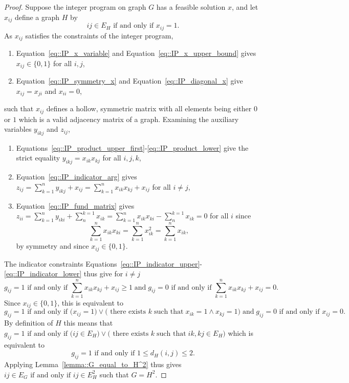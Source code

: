 \documentclass[11pt]{article}
\begin{document}
\begin{proof}
  Suppose the integer program on graph $G$ has a feasible solution $x$, and let $x_{ij}$ define a graph $H$ by 
  \[
  ij \in E_H \text{ if and only if } x_{ij} = 1. 
  \]
  As $x_{ij}$ satisfies the constraints of the integer program, 
  \begin{enumerate}[label=\roman*)]
    \item Equation~\eqref{eq::IP_x_variable} and Equation~\eqref{eq::IP_x_upper_bound} gives $x_{ij} \in \{0 , 1\}$ for all $i,j$,
    \item Equation~\eqref{eq::IP_symmetry_x} and Equation~\eqref{eq::IP_diagonal_x} give $x_{ij} = x_{ji}$ and $x_{ii} = 0$,
  \end{enumerate}
  such that $x_{ij}$ defines a hollow, symmetric matrix with all elements being either $0$ or $1$ which is a valid adjacency matrix of a graph. 
  Examining the auxiliary variables $y_{ikj}$ and $z_{ij}$, 
  \begin{enumerate}[label=\roman*)]
    \item Equations~\eqref{eq::IP_product_upper_first}-\eqref{eq::IP_product_lower} give the strict equality $y_{ikj} = x_{ik}x_{kj}$ for all $i,j,k$,
    \item Equation~\eqref{eq::IP_indicator_arg} gives $\displaystyle z_{ij} = \sum_{k = 1}^{n}y_{ikj} + x_{ij} = \sum_{k = 1}^{n}x_{ik}x_{kj} + x_{ij}$ for all $i \neq j$,
    \item Equation~\eqref{eq::IP_fund_matrix} gives $\displaystyle z_{ii} = \sum_{k = 1}^{n}y_{iki} + \sum_{n}^{k = 1}x_{ik} = \sum_{k = 1}^{n} x_{ik}x_{ki} - \sum_{n}^{k = 1}x_{ik} = 0$ for all $i$ since
    \[
    \sum_{k = 1}^{n} x_{ik}x_{ki} = \sum_{k = 1}^{n} x_{ik}^2 = \sum_{k = 1}^{n} x_{ik},
    \]
    by symmetry and since $x_{ij} \in \{0 , 1\}$. 
  \end{enumerate} 
  The indicator constraints Equations~\eqref{eq::IP_indicator_upper}-\eqref{eq::IP_indicator_lower} thus give for $i \neq j$
  \[
  g_{ij} = 1 \text{ if and only if } \sum_{k=1}^{n} x_{ik}x_{kj} + x_{ij} \geq 1 \; \text{and} \; g_{ij} = 0 \text{ if and only if } \sum_{k=1}^{n} x_{ik}x_{kj} + x_{ij} = 0. 
  \]
  Since $x_{ij} \in \{0,1\}$, this is equivalent to 
  \[
  g_{ij} = 1 \text{ if and only if } \Big(x_{ij} = 1 \Big) \lor \Big(\text{ there exists } k \;\text{such that}\; x_{ik}= 1 \land x_{kj}=1\Big) \; \text{and} \; g_{ij} = 0 \text{ if and only if } x_{ij} = 0. 
  \]
  By definition of $H$ this means that $g_{ij} = 1 \text{ if and only if } \Big( ij \in E_H \Big) \lor \Big( \text{ there exists } k \;\text{such that}\; ik,kj \in E_H\Big)$ which is equivalent to 
  \[
  g_{ij} = 1 \text{ if and only if } 1 \leq d_H(i,j) \leq 2. 
  \]
  Applying Lemma~\ref{lemma::G_equal_to_H^2} thus gives $ij \in E_G \text{ if and only if } ij \in E_H^2$ such that $G=H^2$. 
\end{proof}
\end{document}
